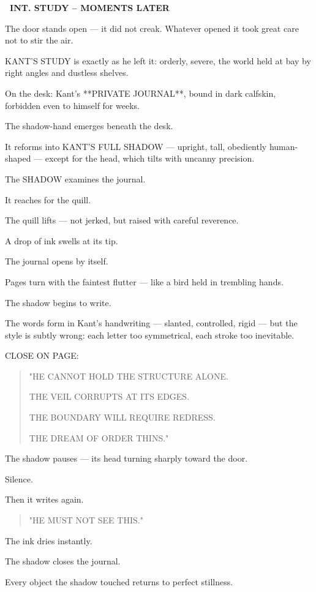 \documentclass[12pt]{article}
\newcommand{\scene}[2]{%
  \vspace{1.8\baselineskip}%
  \noindent\textbf{#1 \ #2}\par\vspace{0.4\baselineskip}%
}
\begin{document}
\scene{}{INT. STUDY -- MOMENTS LATER}

The door stands open —
it did not creak.
Whatever opened it took great care not to stir the air.

KANT'S STUDY is exactly as he left it:
orderly, severe, the world held at bay by right angles and dustless shelves.

On the desk:
Kant’s **PRIVATE JOURNAL**,
bound in dark calfskin,
forbidden even to himself for weeks.

The shadow-hand emerges beneath the desk.

It reforms into KANT’S FULL SHADOW —
upright, tall, obediently human-shaped —
except for the head, which tilts with uncanny precision.

The SHADOW examines the journal.

It reaches for the quill.

The quill lifts —
not jerked,
but raised with careful reverence.

A drop of ink swells at its tip.

The journal opens by itself.

Pages turn with the faintest flutter —
like a bird held in trembling hands.

The shadow begins to write.

The words form in Kant’s handwriting —
slanted, controlled, rigid —
but the style is subtly wrong:
each letter too symmetrical,
each stroke too inevitable.

CLOSE ON PAGE:

\begin{quote}
"HE CANNOT HOLD THE STRUCTURE ALONE.

THE VEIL CORRUPTS AT ITS EDGES.

THE BOUNDARY WILL REQUIRE REDRESS.

THE DREAM OF ORDER THINS."
\end{quote}

The shadow pauses —
its head turning sharply toward the door.

Silence.

Then it writes again.

\begin{quote}
"HE MUST NOT SEE THIS."
\end{quote}

The ink dries instantly.

The shadow closes the journal.

Every object the shadow touched returns to perfect stillness.
\end{document}

